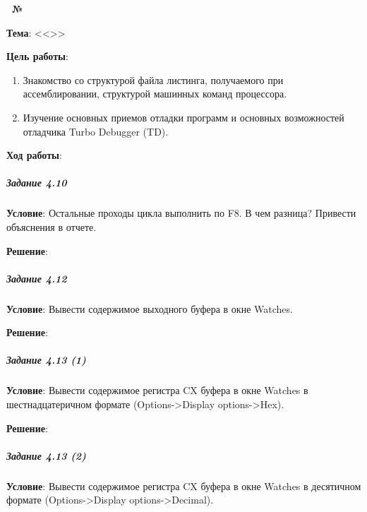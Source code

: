 \begin{center}
   \textbf{\titlePageWorkType~№\titlePageWorkNumber~\titlePageWorkPart}
\end{center}

\textbf{Тема}: <<\titlePageTopic>>

\textbf{Цель работы}: 

\begin{enumerate}
   \item Знакомство со структурой файла листинга, получаемого при ассемблировании, структурой машинных команд процессора.
   \item Изучение основных приемов отладки программ и основных возможностей отладчика Turbo Debugger (TD).
\end{enumerate}

\begin{center}
   \textbf{Ход работы}:
\end{center}












\subparagraph{Задание 4.10}

\textbf{Условие}:
Остальные проходы цикла выполнить по F8. В чем разница? Привести объяснения в отчете.

\textbf{Решение}:



\subparagraph{Задание 4.12}

\textbf{Условие}: Вывести содержимое выходного буфера в окне Watches. 

\textbf{Решение}:



\subparagraph{Задание 4.13 (1)}

\textbf{Условие}: Вывести содержимое регистра CX буфера в окне Watches в шестнадцатеричном формате (Options->Display options->Hex).

\textbf{Решение}:



\subparagraph{Задание 4.13 (2)}

\textbf{Условие}:
Вывести содержимое регистра CX буфера в окне Watches в десятичном формате (Options->Display options->Decimal).

